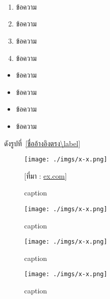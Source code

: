 \pagebreak

\\

\chapter{}

\section{}

\subsection{}

\subsubsection{}

\textbf{}

\underline{}

\begin{enumerate}
  \item ข้อความ
  \item ข้อความ
  \item ข้อความ
  \item ข้อความ
\end{enumerate}

\begin{itemize}
  \item ข้อความ
  \item ข้อความ
  \item ข้อความ
  \item ข้อความ
\end{itemize}


ดังรูปที่~\ref{ชื่ออ้างอิงตรง\label}


\begin{figure}[H]\centering
    \setlength{\fboxrule}{0.2mm}  %
    \setlength{\fboxsep}{1cm}     %
    \fbox{}                       %
    \texttt{[image: ./imgs/x-x.png]}
    \caption{caption}\label{fig:x-x}
    \small [ที่มา : \url{ex.com}]
\end{figure}

\begin{figure}[H]\centering
    \texttt{[image: ./imgs/x-x.png]}
    \caption{caption}\label{fig:x-x}
\end{figure}

\begin{figure}[H]\centering
    \begin{minipage}{.3\textwidth}
      \centering
      \texttt{[image: ./imgs/x-x.png]}
      \caption{caption}\label{fig:3-4}
    \end{minipage}
    \begin{minipage}{.3\textwidth}
      \centering
      \texttt{[image: ./imgs/x-x.png]}
      \caption{caption}\label{fig:3-5}
    \end{minipage}
  \end{figure}